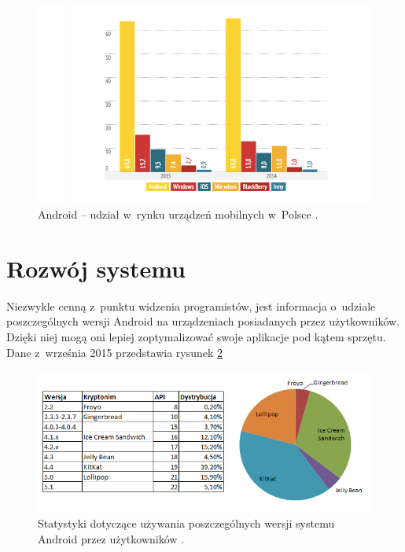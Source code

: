 \begin{figure}[!htb]
    \centering
    \includegraphics[width=15cm]{imgs/ch2_android_udzial_1.png}
    \caption
{Android – udział w~rynku urządzeń mobilnych w~Polsce \cite{website:android:stat1}.}
    \label{fig:android_udzial_polska}
\end{figure} 

\newpage

\section{Rozwój systemu}
Niezwykle cenną z~punktu widzenia programistów, jest informacja o~udziale poszczególnych wersji Android na urządzeniach posiadanych przez użytkowników. Dzięki niej mogą oni lepiej zoptymalizować swoje aplikacje pod kątem sprzętu. Dane z~września 2015 przedstawia rysunek \ref{fig:android_udzial_wersje}

\begin{figure}[!htb]
    \centering
    \includegraphics[width=17cm]{imgs/ch2_android_udzial_3pl.png}
    \caption
{Statystyki dotyczące używania poszczególnych wersji systemu Android przez użytkowników \cite{website:android:now}.}
    \label{fig:android_udzial_wersje}
\end{figure} 

